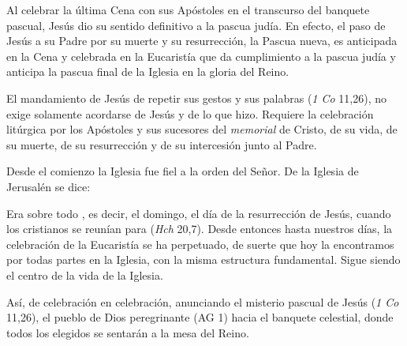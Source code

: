 \begin{ccebody}
 Al celebrar la última Cena con sus Apóstoles en el transcurso del banquete pascual, Jesús dio su sentido definitivo a la pascua judía. En efecto, el paso de Jesús a su Padre por su muerte y su resurrección, la Pascua nueva, es anticipada en la Cena y celebrada en la Eucaristía que da cumplimiento a la pascua judía y anticipa la pascua final de la Iglesia en la gloria del Reino.

\newpage
{}

 El mandamiento de Jesús de repetir sus gestos y sus palabras  (\textit{1 Co} 11,26), no exige solamente acordarse de Jesús y de lo que hizo. Requiere la celebración litúrgica por los Apóstoles y sus sucesores del \textit{memorial} de Cristo, de su vida, de su muerte, de su resurrección y de su intercesión junto al Padre.

 Desde el comienzo la Iglesia fue fiel a la orden del Señor. De la Iglesia de Jerusalén se dice:


 Era sobre todo , es decir, el domingo, el día de la resurrección de Jesús, cuando los cristianos se reunían para  (\textit{Hch} 20,7). Desde entonces hasta nuestros días, la celebración de la Eucaristía se ha perpetuado, de suerte que hoy la encontramos por todas partes en la Iglesia, con la misma estructura fundamental. Sigue siendo el centro de la vida de la Iglesia.

 Así, de celebración en celebración, anunciando el misterio pascual de Jesús  (\textit{1 Co} 11,26), el pueblo de Dios peregrinante  (AG 1) hacia el banquete celestial, donde todos los elegidos se sentarán a la mesa del Reino.
\end{ccebody}


